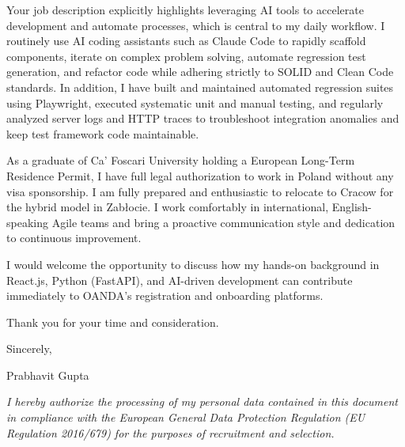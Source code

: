 \documentclass[11pt,a4paper]{article}
\begin{document}
Your job description explicitly highlights leveraging AI tools to accelerate development and automate processes, which is central to my daily workflow. I routinely use AI coding assistants such as Claude Code to rapidly scaffold components, iterate on complex problem solving, automate regression test generation, and refactor code while adhering strictly to SOLID and Clean Code standards. In addition, I have built and maintained automated regression suites using Playwright, executed systematic unit and manual testing, and regularly analyzed server logs and HTTP traces to troubleshoot integration anomalies and keep test framework code maintainable.

As a graduate of Ca' Foscari University holding a European Long-Term Residence Permit, I have full legal authorization to work in Poland without any visa sponsorship. I am fully prepared and enthusiastic to relocate to Cracow for the hybrid model in Zab\l{}ocie. I work comfortably in international, English-speaking Agile teams and bring a proactive communication style and dedication to continuous improvement.

I would welcome the opportunity to discuss how my hands-on background in React.js, Python (FastAPI), and AI-driven development can contribute immediately to OANDA's registration and onboarding platforms.

Thank you for your time and consideration.

\vspace{12pt}
Sincerely,

\vspace{6pt}
Prabhavit Gupta

\vfill
\footnotesize
\textit{I hereby authorize the processing of my personal data contained in this document in compliance with the European General Data Protection Regulation (EU Regulation 2016/679) for the purposes of recruitment and selection.}
\end{document}
